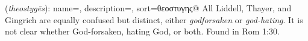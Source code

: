 \item[God-hating (inconclusive),]

(\textit{theostygēs}):
{
    name=,
    description={},
    sort=θεοστυγης@
}
All Liddell, Thayer, and Gingrich are equally confused but distinct, either \emph{godforsaken} or \emph{god-hating}. It is not clear whether God-forsaken, hating God, or both.
Found in Rom 1:30.
